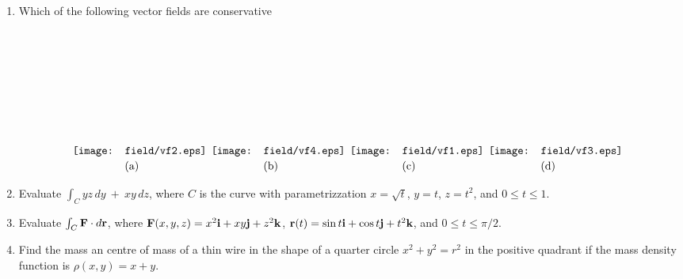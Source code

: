 \documentclass[12pt]{article}
\newcommand{\bfF}{{\bf F}}    %
\newcommand{\bfr}{{\bf r}}    %
\newcommand{\bfi}{{\bf i}}    %
\newcommand{\bfj}{{\bf j}}    %
\newcommand{\bfk}{{\bf k}}    %
\begin{document}
\begin{enumerate}
 \item Which of the following vector fields are conservative
\[
  \begin{picture}(125,130)
   \put(0,14){\texttt{[image: field/vf2.eps]}}
   \put(47,0){(a)}
  \end{picture}
  \begin{picture}(125,130)
   \put(0,14){\texttt{[image: field/vf4.eps]}}
   \put(47,0){(b)}
  \end{picture}
  \begin{picture}(125,130)
   \put(0,14){\texttt{[image: field/vf1.eps]}}
   \put(47,0){(c)}
  \end{picture}
  \begin{picture}(125,130)
   \put(0,14){\texttt{[image: field/vf3.eps]}}
   \put(47,0){(d)}
  \end{picture}
\]

   
\item Evaluate $\int_C yz\, dy \ +\ xy\,dz$, where $C$ is the curve with parametrizzation $x=\sqrt{t}$, $y=t$, $z=t^2$, and $0\leq t\leq 1$.
\vspace{-2pt}
   

   
\item Evaluate $\int_C \bfF \cdot d\bfr$, where  $\bfF(x,y,z)=x^2\bfi+xy\bfj + z^2\bfk$,
    $\bfr(t)= \sin t \bfi + \cos t \bfj + t^2\bfk$, and $0\leq t \leq \pi/2$.
\vspace{-2pt}
   
   
\item  Find the mass an centre of mass of a thin wire in the shape of a quarter circle $x^2+y^2=r^2$ in the positive quadrant if the mass
  density function is $\rho(x,y)=x+y$.
\vspace{-2pt}
   

\end{enumerate}
\end{document}
